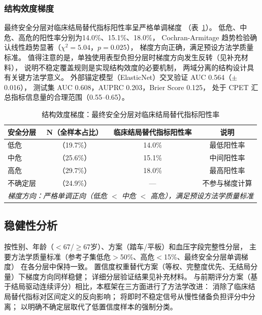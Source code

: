 \documentclass[12pt, a4paper]{ctexart}
\begin{document}
\subsubsection{结构效度梯度}

最终安全分层对临床结局替代指标阳性率呈严格单调梯度
（表~\ref{tab:construct_validity}）。
低危、中危、高危的阳性率分别为14.0\%、15.1\%、18.0\%，
Cochran-Armitage 趋势检验确认线性趋势显著（$\chi^2 = 5.04$，$p = 0.025$），
梯度方向正确，满足预设方法学质量标准。
值得注意的是，单独使用表型负担分层时梯度方向发生反转（见补充材料），
说明不稳定覆盖规则是实现结构效度的必要机制，
两域分离的结构设计具有关键方法学意义。
外部锚定模型（ElasticNet）交叉验证 AUC 0.564（$\pm$0.016），
测试集 AUC 0.608，AUPRC 0.203，Brier Score 0.125，
处于 CPET 汇总指标信息量的合理范围（0.55--0.65）。

\begin{table}[htbp]
\centering
\small
\caption{结构效度梯度：最终安全分层对临床结局替代指标阳性率}
\label{tab:construct_validity}
\begin{tabular}{lccc}
\toprule
安全分层 & N（全样本占比）& 临床结局替代指标阳性率 & 说明 \\
\midrule
低危 & （19.7\%）& 14.0\% & 最低阳性率 \\
中危 & （25.6\%）& 15.1\% & 中间阳性率 \\
高危 & （29.7\%）& 18.0\% & 最高阳性率 \\
不确定层 & （24.9\%）& — & 不参与梯度计算 \\
\midrule
\multicolumn{4}{l}{\textit{梯度方向：严格单调正向（低危 $<$ 中危 $<$ 高危），满足预设方法学质量标准}} \\
\bottomrule
\end{tabular}
\end{table}

\subsection{稳健性分析}

按性别、年龄（$<$67/$\geq$67岁）、方案（踏车/平板）和血压字段完整性分层，
主要方法学质量标准（参考子集低危$>$50\%、高危$<$15\%、最终安全分层单调梯度）
在各分层中保持一致。
置信度权重替代方案（等权、完整度优先、无结局分量）下梯度方向同样稳健；
详细分层验证结果见补充材料。
与前期评分方案（基于结局驱动连续评分）相比，本框架在三方面进行了方法学改进：
消除了临床结局替代指标对区间定义的反向影响；
将即时不稳定信号从慢性储备负担评分中分离；
以明确不确定层取代了低置信度样本的强制分类。

\end{document}
